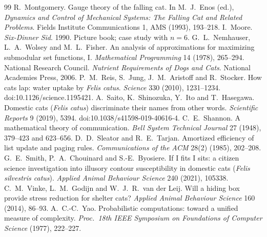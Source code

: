 \documentclass[11pt,a4paper]{article}
\theoremstyle{plain}
\theoremstyle{definition}
\theoremstyle{remark}
\numberwithin{equation}{section}
\begin{document}
\begin{thebibliography}{99}
 R.~Montgomery. Gauge theory of the falling cat. In M.~J.~Enos (ed.), \emph{Dynamics and Control of Mechanical Systems: The Falling Cat and Related Problems}. Fields Institute Communications 1, AMS (1993), 193--218.
 I.~Moore. \emph{Six-Dinner Sid}. 1990. Picture book; case study with $n=6$.
 G.~L.~Nemhauser, L.~A.~Wolsey and M.~L.~Fisher. An analysis of approximations for maximizing submodular set functions, I. \emph{Mathematical Programming} 14 (1978), 265--294.
 National Research Council. \emph{Nutrient Requirements of Dogs and Cats}. National Academies Press, 2006.
 P.~M.~Reis, S.~Jung, J.~M.~Aristoff and R.~Stocker. How cats lap: water uptake by \emph{Felis catus}. \emph{Science} 330 (2010), 1231--1234. doi:10.1126/science.1195421.
 A.~Saito, K.~Shinozuka, Y.~Ito and T.~Hasegawa. Domestic cats (\emph{Felis catus}) discriminate their names from other words. \emph{Scientific Reports} 9 (2019), 5394. doi:10.1038/s41598-019-40616-4.
 C.~E.~Shannon. A mathematical theory of communication. \emph{Bell System Technical Journal} 27 (1948), 379--423 and 623--656.
 D.~D.~Sleator and R.~E.~Tarjan. Amortized efficiency of list update and paging rules. \emph{Communications of the ACM} 28(2) (1985), 202--208.
 G.~E.~Smith, P.~A.~Chouinard and S.-E.~Byosiere. If I fits I sits: a citizen science investigation into illusory contour susceptibility in domestic cats (\emph{Felis silvestris catus}). \emph{Applied Animal Behaviour Science} 240 (2021), 105338.
 C.~M.~Vinke, L.~M.~Godijn and W.~J.~R.~van der Leij. Will a hiding box provide stress reduction for shelter cats? \emph{Applied Animal Behaviour Science} 160 (2014), 86--93.
 A.~C.-C.~Yao. Probabilistic computations: toward a unified measure of complexity. \emph{Proc.\ 18th IEEE Symposium on Foundations of Computer Science} (1977), 222--227.
\end{thebibliography}
\end{document}
